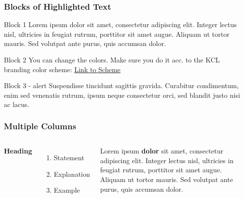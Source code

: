 \documentclass{beamer}
\begin{document}
\begin{frame}
\frametitle{Blocks of Highlighted Text}
\begin{block}{Block 1}
Lorem ipsum dolor sit amet, consectetur adipiscing elit. Integer lectus nisl, ultricies in feugiat rutrum, porttitor sit amet augue. Aliquam ut tortor mauris. Sed volutpat ante purus, quis accumsan dolor.
\end{block}

{
\begin{block}{Block 2}
You can change the colors. Make sure you do it  acc. to the KCL branding color scheme:
\href{https://internal.kcl.ac.uk/erd/depts/brand-and-marketing-portal/Documents/brand-resources/docs/Colour-palette.pdf}{\color{PantoneLimeGreen}\underline{Link to Scheme}}
\end{block}
}

\begin{alertblock}{Block 3 - alert}
Suspendisse tincidunt sagittis gravida. Curabitur condimentum, enim sed venenatis rutrum, ipsum neque consectetur orci, sed blandit justo nisi ac lacus.
\end{alertblock}
\end{frame}


\begin{frame}
\frametitle{Multiple Columns}
\begin{columns}[c] %

\textbf{Heading}
\begin{enumerate}
\item Statement
\item Explanation
\item Example
\end{enumerate}

Lorem ipsum \textbf{dolor} sit amet, consectetur adipiscing elit. Integer lectus nisl, ultricies in feugiat rutrum, porttitor sit amet augue. Aliquam ut tortor mauris. Sed volutpat ante purus, quis accumsan dolor.

\end{columns}
\end{frame}

\end{document}
